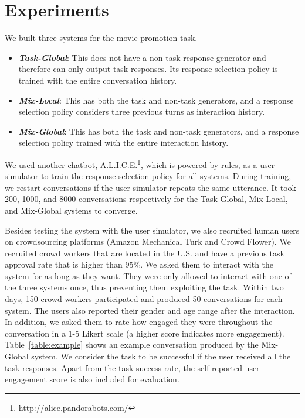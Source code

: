 \documentclass[11pt]{article}
\begin{document}
\section{Experiments}

We built three systems for the movie promotion task.
\begin{itemize}
    \item \textbf{\textit{Task-Global}}: This does not have a non-task response generator and therefore can only output task responses. Its response selection policy is trained with the entire conversation history.
    \item \textbf{\textit{Mix-Local}}: This has both the task and non-task generators, and a response selection policy considers three previous turns as interaction history. 
    \item \textbf{\textit{Mix-Global}}: This has both the task and non-task generators, and a response selection policy trained with the entire interaction history.
\end{itemize}

We used another chatbot, A.L.I.C.E.\footnote{http://alice.pandorabots.com/}, which is powered by rules, as a user simulator to train the response selection policy for all systems. During training, we restart conversations if the user simulator repeats the same utterance. It took 200, 1000, and 8000 conversations respectively for the Task-Global, Mix-Local, and Mix-Global systems to converge.


Besides testing the system with the user simulator, we also recruited human users on crowdsourcing platforms (Amazon Mechanical Turk and Crowd Flower). We recruited crowd workers that are located in the U.S. and have a previous task approval rate that is higher than 95\%. We asked them to interact with the system for as long as they want. They were only allowed to interact with one of the three systems once, thus preventing them exploiting the task. Within two days, 150 crowd workers participated and produced 50 conversations for each system. The users also reported their gender and age range after the interaction. In addition, we asked them to rate how engaged they were throughout the conversation in a 1-5 Likert scale (a higher score indicates more engagement). Table~\ref{table:example} shows an example conversation produced by the Mix-Global system. We consider the task to be successful if the user received all the task responses. Apart from the task success rate, the self-reported user engagement score is also included for evaluation. 
\end{document}
